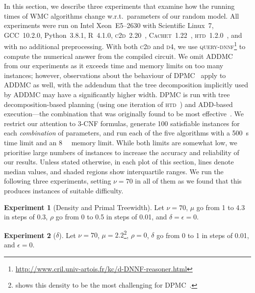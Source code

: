 \documentclass{article}
\theoremstyle{definition}
\newtheorem{experiment}{Experiment}
\begin{document}
In this section, we describe three experiments that examine how the running
times of \textsf{WMC} algorithms change w.r.t.\ parameters of our random model.
All experiments were run on Intel Xeon~E5--2630 with Scientific Linux~7,
GCC~10.2.0, Python~3.8.1, R~4.1.0,
\textsc{c2d}~2.20~\cite{DBLP:conf/ecai/Darwiche04},
\textsc{Cachet}~1.22~\cite{DBLP:conf/sat/SangBBKP04},
\textsc{htd}~1.2.0~\cite{DBLP:conf/cpaior/AbseherMW17}, and with no additional preprocessing. With both \textsc{c2d} and \textsc{d4}, we use \textsc{query-dnnf}\footnote{\url{http://www.cril.univ-artois.fr/kc/d-DNNF-reasoner.html}} to compute the numerical answer from the compiled circuit. We omit \textsc{ADDMC}~\cite{DBLP:conf/aaai/DudekPV20} from our experiments as it exceeds time and memory limits on too many instances; however, observations about the behaviour of \textsc{DPMC}~\cite{DBLP:conf/cp/DudekPV20} apply to \textsc{ADDMC} as well, with the addendum that the tree decomposition implicitly used by \textsc{ADDMC} may have a significantly higher width. \textsc{DPMC} is run with tree decomposition-based planning (using one iteration of \textsc{htd}~\cite{DBLP:conf/cpaior/AbseherMW17}) and ADD-based execution---the combination that was originally found to be most effective~\cite{DBLP:conf/cp/DudekPV20}. We restrict our attention to 3-CNF formulas, generate 100 satisfiable instances for each \emph{combination} of parameters, and run each of the five algorithms with a \SI{500}{\second} time limit and an \SI{8}{\gibi\byte} memory limit. While both limits are somewhat low, we prioritise large numbers of instances to increase the accuracy and reliability of our results. Unless stated otherwise, in each plot of this section, lines denote median values, and shaded regions show interquartile ranges. We run the following three experiments, setting $\nu = 70$ in all of them as we found that this produces instances of suitable difficulty.

\begin{experiment}[Density and Primal Treewidth]\label{exp:density}
  Let $\nu = 70$, $\mu$ go from 1 to 4.3 in steps of 0.3, $\rho$ go from 0 to
  0.5 in steps of 0.01, and $\delta = \epsilon = 0$.
\end{experiment}

\begin{experiment}[$\delta$]\label{exp:delta}
  Let $\nu = 70$, $\mu = 2.2$\footnote{ shows this density to
    be the most challenging for \textsc{DPMC}~\cite{DBLP:conf/cp/DudekPV20}.},
  $\rho = 0$, $\delta$ go from 0 to 1 in steps of 0.01, and $\epsilon = 0$.
\end{experiment}
\end{document}
